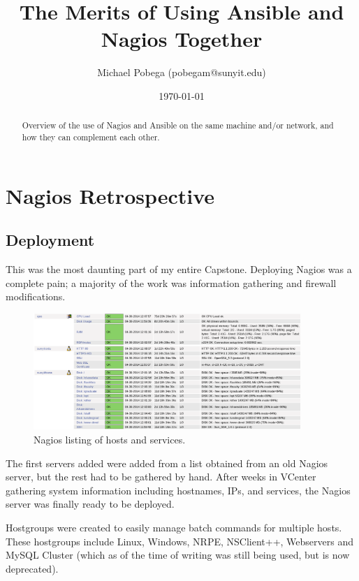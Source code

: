 \documentclass[a4paper]{article}
\title{The Merits of Using Ansible and Nagios Together}
\author{Michael Pobega (pobegam@sunyit.edu)}
\date{\today}
\begin{document}
\begin{titlepage}
\clearpage\maketitle
\thispagestyle{empty}

\begin{abstract}
Overview of the use of Nagios and Ansible on the same machine and/or network, and how they can complement each other.
\end{abstract}

\clearpage
\thispagestyle{empty}
\tableofcontents
\end{titlepage}
\clearpage

\section{Nagios Retrospective}

\subsection{Deployment}

This was the most daunting part of my entire Capstone. Deploying Nagios was a complete pain; a majority of the work was information gathering and firewall modifications.

\begin{figure}[H]
\centering
\includegraphics[width=0.9\textwidth]{nagios-services.png}
\caption{\label{fig:nagserv}Nagios listing of hosts and services.}
\end{figure}

The first servers added were added from a list obtained from an old Nagios server, but the rest had to be gathered by hand. After weeks in VCenter gathering system information including hostnames, IPs, and services, the Nagios server was finally ready to be deployed. 

Hostgroups were created to easily manage batch commands for multiple hosts. These hostgroups include Linux, Windows, NRPE, NSClient++, Webservers and MySQL Cluster (which as of the time of writing was still being used, but is now deprecated).
\end{document}
